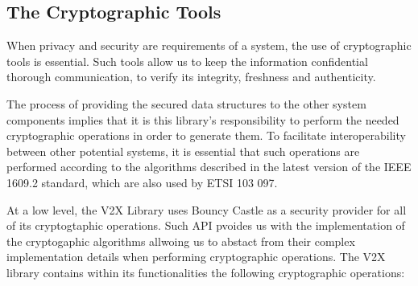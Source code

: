 \subsection{The Cryptographic Tools}
When privacy and security are requirements of a system, the use of cryptographic tools is essential. Such tools allow us to keep the information confidential thorough communication, to verify its integrity, freshness and authenticity.

The process of providing the secured data structures to the other system components implies that it is this library’s responsibility to perform the needed cryptographic operations in order to generate them. To facilitate interoperability between other potential systems, it is essential that such operations are performed according to the algorithms described in the latest version of the IEEE 1609.2 standard, which are also used by ETSI 103 097.

At a low level, the V2X Library uses Bouncy Castle as a security provider for all of its cryptogtaphic operations. Such API pvoides us with the implementation of the cryptogaphic algorithms allwoing us to abstact from their complex implementation details when performing cryptographic operations.
The V2X library contains within its functionalities the following cryptographic operations: 

